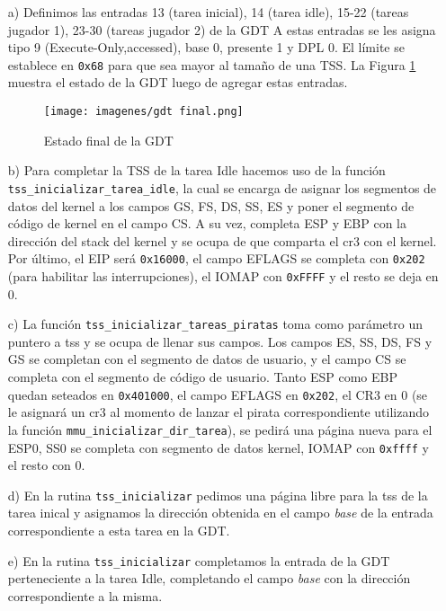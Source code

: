\begin{enumerate}

\item[a)]Definimos las entradas 13 (tarea inicial), 14 (tarea idle), 15-22 (tareas jugador 1), 23-30 (tareas jugador 2) de la GDT
A estas entradas se les asigna tipo 9 (Execute-Only,accessed), base 0, presente 1 y DPL 0. El límite se establece en {\tt 0x68} para que sea mayor al tamaño de una TSS. La Figura \ref{fig:gdt2} muestra el estado de la GDT luego de agregar estas entradas.

\begin{figure}[h]
	  \centering
	    \texttt{[image: imagenes/gdt final.png]}
	     \caption{Estado final de la GDT}
	  \label{fig:gdt2}
	\end{figure}

\item[b)]Para completar la TSS de la tarea Idle hacemos uso de la función {\tt tss\_inicializar\_tarea\_idle}, la cual se encarga de asignar los segmentos de datos del kernel a los campos GS, FS, DS, SS, ES y poner el segmento de código de kernel en el campo CS. A su vez, completa ESP y EBP con la dirección del stack del kernel y se ocupa de que comparta el cr3 con el kernel. Por último, el EIP será {\tt 0x16000}, el campo EFLAGS se completa con {\tt 0x202} (para habilitar las interrupciones), el IOMAP con {\tt 0xFFFF} y el resto se deja en 0.

\item[c)] La función {\tt tss\_inicializar\_tareas\_piratas} toma como parámetro un puntero a tss y se ocupa de llenar sus campos. Los campos ES, SS, DS, FS y GS se completan con el segmento de datos de usuario, y el campo CS se completa con el segmento de código de usuario. Tanto ESP como EBP quedan seteados en {\tt 0x401000}, el campo EFLAGS en {\tt 0x202}, el CR3 en 0 (se le asignará un cr3 al momento de lanzar el pirata correspondiente utilizando la función {\tt mmu_inicializar_dir_tarea}), se pedirá una página nueva para el ESP0, SS0 se completa con segmento de datos kernel, IOMAP con {\tt 0xffff} y el resto con 0. 

\item[d)] En la rutina {\tt tss\_inicializar} pedimos una página libre para la tss de la tarea inical y asignamos la dirección obtenida en el campo {\it base} de la entrada correspondiente a esta tarea en la GDT.

\item[e)] En la rutina {\tt tss\_inicializar} completamos la entrada de la GDT perteneciente a la tarea Idle, completando el campo {\it base} con la dirección correspondiente a la misma.


\end{enumerate}
